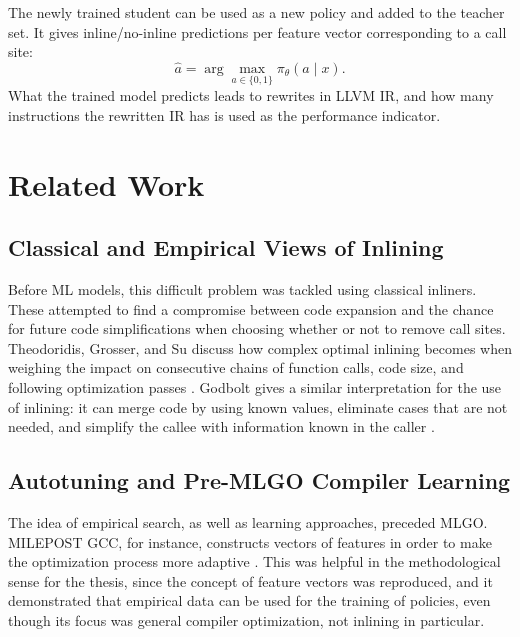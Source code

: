 \documentclass[12pt, a4paper]{report}
\begin{document}
The newly trained student can be used as a new policy and added to the teacher
set. It gives inline/no-inline predictions per feature vector corresponding to
a call site:
\[
  \hat{a} = \arg\max_{a\in\{0,1\}} \pi_\theta(a \mid x).
\]
What the trained model predicts leads to rewrites in LLVM IR, and how many
instructions the rewritten IR has is used as the performance indicator.


\chapter{Related Work}

\section{Classical and Empirical Views of Inlining}

Before ML models, this difficult problem was tackled using classical inliners.
These attempted to find a compromise between code expansion and the chance for
future code simplifications when choosing whether or not to remove call sites.
Theodoridis, Grosser, and Su discuss how complex optimal inlining becomes when
weighing the impact on consecutive chains of function calls, code size, and
following optimization passes \cite{theodoridis2022optimal}. Godbolt gives a
similar interpretation for the use of inlining: it can merge code by using
known values, eliminate cases that are not needed, and simplify the callee with
information known in the caller \cite{godbolt2019optimizations,godbolt2025inlining}.

\section{Autotuning and Pre-MLGO Compiler Learning}

The idea of empirical search, as well as learning approaches, preceded MLGO.
MILEPOST GCC, for instance, constructs vectors of features in order to make the
optimization process more adaptive \cite{milepostgcc}. This was helpful in the
methodological sense for the thesis, since the concept of feature vectors was
reproduced, and it demonstrated that empirical data can be used for the training
of policies, even though its focus was general compiler optimization, not
inlining in particular.
\end{document}
